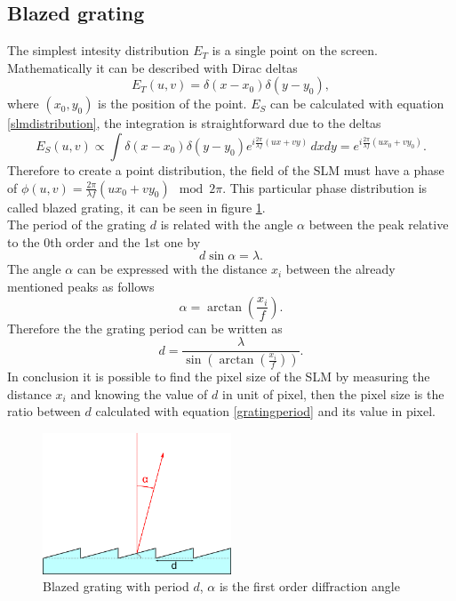 \documentclass[a4paper,10pt]{article}
\begin{document}
\subsection{Blazed grating}\label{blazedsection}
The simplest intesity distribution $E_T$ is a single point on the screen. Mathematically it can be described with Dirac deltas
\begin{equation}E_T(u,v) = \delta(x-x_0)\delta(y-y_0),\end{equation}
where $(x_0,y_0)$ is the position of the point. $E_S$ can be calculated with equation \eqref{slmdistribution}, the integration is straightforward due to the deltas
\begin{equation}E_S(u,v) \propto \int \delta(x-x_0)\delta(y-y_0)e^{i\frac{2\pi}{\lambda f}(ux+vy)}\,dxdy = e^{i\frac{2\pi}{\lambda f}(ux_0+vy_0)}.\end{equation}
Therefore to create a point distribution, the field of the SLM must have a phase of $\phi(u,v) = \frac{2\pi}{\lambda f}(ux_0+vy_0) \mod 2\pi$. This particular phase distribution is called blazed grating, it can be seen in figure \ref{blazed}.\\
The period of the grating $d$ is related with the angle $\alpha$ between the peak relative to the 0th order and the 1st one by \cite{grating}
\begin{equation}d\sin \alpha = \lambda.\end{equation}
The angle $\alpha$ can be expressed with the distance $x_i$ between the already mentioned peaks as follows \cite{skriptum}
\begin{equation}\alpha =\arctan\left(\frac{x_i}{f}\right).\end{equation}
Therefore the the grating period can be written as
\begin{equation}\label{gratingperiod} d = \frac{\lambda}{\sin\left(\arctan\left(\frac{x_i}{f}\right)\right)}.\end{equation}
In conclusion it is possible to find the pixel size of the SLM by measuring the distance $x_i$ and knowing the value of $d$ in unit of pixel, then the pixel size is the ratio between $d$ calculated with equation \eqref{gratingperiod} and its value in pixel.\\
\begin{figure}[H]
\centering
\includegraphics[width=0.5\textwidth]{blazed}
\caption{Blazed grating with period $d$, $\alpha$ is the first order diffraction angle }\label{blazed}
\end{figure}
\end{document}
